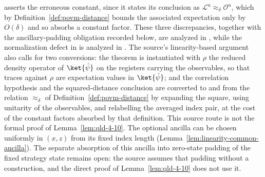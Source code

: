 \begin{remark}
	asserts the erroneous constant, since it states its conclusion as
	$\mathcal{L}^u \approx_\delta \mathcal{O}^u$, which by
	Definition~\ref{def:povm-distance} bounds the associated expectation
	only by $O(\delta)$ and so absorbs a constant factor. These three
	discrepancies, together with the ancillary-padding obligation recorded
	below, are analyzed in
	\cite{gap:qpbt_linearity-theorem-quotation}, while the normalization defect
	in \cite[Theorem~10]{Natarajan2017Linearity} is analyzed in
	\cite{gap:qpbt_linearity-distance-normalization}. The source's
	linearity-based argument also calls for two conversions: the theorem is
	instantiated with $\rho$ the reduced density operator of
	$\ket{\hat\psi}$ on the registers carrying the observables, so that
	traces against $\rho$ are expectation values in $\ket{\hat\psi}$; and
	the correlation hypothesis and the squared-distance conclusion are
	converted to and from the relation $\approx_\delta$ of
	Definition~\ref{def:povm-distance} by expanding the square, using
	unitarity of the observables, and relabelling the averaged index
	pair, at the cost of the constant factors absorbed by that
	definition. This source route is not the formal proof of
	Lemma~\ref{lem:qld-4-10}. The optional ancilla can be chosen uniformly
	in $(x,z)$ from its fixed index length (Lemma~\ref{lem:linearity-common-ancilla}).
	The separate absorption of this ancilla into zero-state padding of the
	fixed strategy state remains open: the source assumes that padding without
	a construction, and the direct proof of Lemma~\ref{lem:qld-4-10} does not
	use it.
\end{remark}

